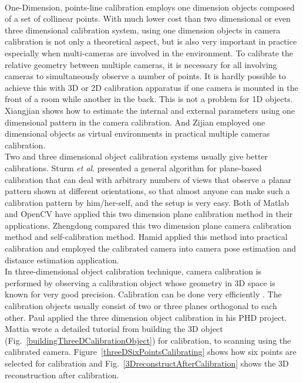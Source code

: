 \\\indent
One-Dimension, points-line calibration employs one dimension objects composed of a set of collinear points. With much lower cost than two dimensional or even three dimensional calibration system, using one dimension objects in camera calibration is not only a theoretical aspect, but is also very important in practice especially when multi-cameras are involved in the environment. To calibrate the relative geometry between multiple cameras, it is necessary for all involving cameras to simultaneously observe a number of points. It is hardly possible to achieve this with \gls{3D} or 2D calibration apparatus if one camera is mounted in the front of a room while another in the back. This is not a problem for 1D objects. Xiangjian \cite{oneDcalibration1_2006} shows how to estimate the internal and external parameters using one dimensional pattern in the camera calibration. And Zijian \cite{oneDcalibration2_2008} employed one dimensional objects as virtual environments in practical multiple cameras calibration.
\\\indent
Two and three dimensional object calibration systems usually give better calibrations. Sturm \textit{et al}. \cite{twoDcalibration1_1999} presented a general algorithm for plane-based calibration
that can deal with arbitrary numbers of views that observe a planar pattern shown at different orientations, so that almost anyone can make such a calibration pattern by him/her-self, and the setup is very easy. Both of Matlab and OpenCV have applied this two dimension plane calibration method in their applications. Zhengdong \cite{twoDcalibration2_2011} compared this two dimension plane camera calibration method and self-calibration method. Hamid \cite{twoDcalibration3_2015} applied this method into practical calibration and employed the calibrated camera into camera pose estimation and distance estimation application.
\\\indent
In three-dimensional object calibration technique, camera calibration is performed by observing a calibration object whose geometry in \gls{3D} space is known for very good precision. Calibration can be done very efficiently \cite{treeDcalibration1_1993}. The calibration objects usually consist of two or three planes orthogonal to each other. Paul \cite{treeDcalibration2_1996} applied the three dimension object calibration in his PHD project. Mattia \cite{threeDExample_2014} wrote a detailed tutorial from building the \gls{3D} object (Fig.~\ref{buildingThreeDCalibrationObject}) for calibration, to scanning using the calibrated camera. Figure~\ref{threeDSixPointsCalibrating} shows how six points are selected for calibration and Fig.~\ref{3DreconstructAfterCalibration} shows the \gls{3D} reconstruction after calibration.
